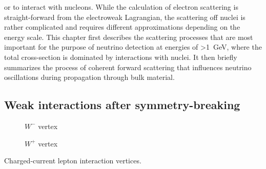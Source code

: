 or to interact with nucleons.
While the calculation of electron scattering is straight-forward from the electroweak Lagrangian, the scattering off nuclei is rather complicated and requires different approximations depending on the energy scale.
This chapter first describes the scattering processes that are most important for the purpose of neutrino detection at energies of \SI{>1}{\giga\eV}, where the total cross-section is dominated by interactions with nuclei.
It then briefly summarizes the process of coherent forward scattering that influences neutrino oscillations during propagation through bulk material.

\subsection{Weak interactions after symmetry-breaking}
\begin{marginfigure}
\centering
\begin{subfigure}[t]{0.49\linewidth}
    \caption{$W^-$ vertex}
\end{subfigure}
\begin{subfigure}[t]{0.49\linewidth}
    \caption{$W^+$ vertex}
\end{subfigure}
\caption{Charged-current lepton interaction vertices.}
\label{fig:cc-vertices}
\end{marginfigure}
